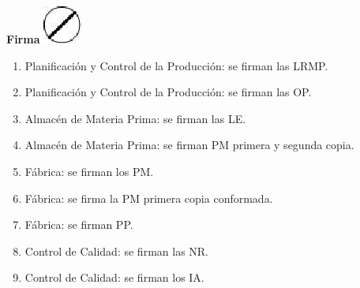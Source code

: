\begin{center}
  \textbf{Firma}
  \includegraphics{./Images/Simbolos/simbolo-Firma.png}
\end{center}
\begin{enumerate}
  \item Planificaci\'on y Control de la Producci\'on: se firman las LRMP.
  \item Planificaci\'on y Control de la Producci\'on: se firman las OP.
  \item Almac\'en de Materia Prima: se firman las LE.
  \item Almac\'en de Materia Prima: se firman PM primera y segunda copia.
  \item F\'abrica: se firman los PM.
  \item F\'abrica: se firma la PM primera copia conformada.
  \item F\'abrica: se firman PP.
  \item Control de Calidad: se firman las NR.
  \item Control de Calidad: se firman los IA.
\end{enumerate}

